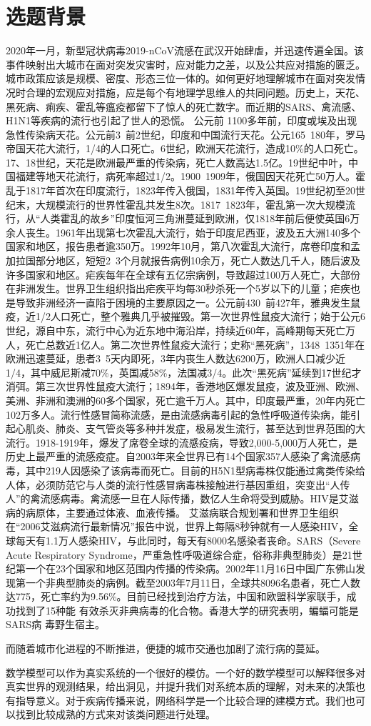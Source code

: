\chapter{选题背景}

2020年一月，新型冠状病毒2019-nCoV流感在武汉开始肆虐，并迅速传遍全国。该事件映射出大城市在面对突发灾害时，应对能力之差，以及公共应对措施的匮乏。城市政策应该是规模、密度、形态三位一体的\cite{xiu_2003}。如何更好地理解城市在面对突发情况时合理的宏观应对措施，应是每个有地理学思维人的共同问题。历史上，天花、黑死病、痢疾、霍乱等瘟疫都留下了惊人的死亡数字。而近期的SARS、禽流感、H1N1等疾病的流行也引起了世人的恐慌。 公元前 1100多年前，印度或埃及出现急性传染病天花。公元前3~前2世纪，印度和中国流行天花。公元165~180年，罗马帝国天花大流行，1/4的人口死亡。6世纪，欧洲天花流行，造成10\%的人口死亡。17、18世纪，天花是欧洲最严重的传染病，死亡人数高达1.5亿。19世纪中叶，中国福建等地天花流行，病死率超过1/2。1900~1909年，俄国因天花死亡50万人。霍乱于1817年首次在印度流行，1823年传入俄国，1831年传入英国。19世纪初至20世纪末，大规模流行的世界性霍乱共发生8次。1817~1823年，霍乱第一次大规模流行，从“人类霍乱的故乡”印度恒河三角洲蔓延到欧洲，仅1818年前后便使英国6万余人丧生。1961年出现第七次霍乱大流行，始于印度尼西亚，波及五大洲140多个国家和地区，报告患者逾350万。1992年10月，第八次霍乱大流行，席卷印度和孟加拉国部分地区，短短2~3个月就报告病例10余万，死亡人数达几千人，随后波及许多国家和地区。疟疾每年在全球有五亿宗病例，导致超过100万人死亡，大部份在非洲发生。世界卫生组织指出疟疾平均每30秒杀死一个5岁以下的儿童；疟疾也是导致非洲经济一直陷于困境的主要原因之一。公元前430~前427年，雅典发生鼠疫，近1/2人口死亡，整个雅典几乎被摧毁。第一次世界性鼠疫大流行；始于公元6世纪，源自中东，流行中心为近东地中海沿岸，持续近60年，高峰期每天死亡万人，死亡总数近1亿人。第二次世界性鼠疫大流行；史称“黑死病”，1348~1351年在欧洲迅速蔓延，患者3~5天内即死，3年内丧生人数达6200万，欧洲人口减少近1/4，其中威尼斯减70\%，英国减58\%，法国减3/4。此次“黑死病”延续到17世纪才消弭。第三次世界性鼠疫大流行；1894年，香港地区爆发鼠疫，波及亚洲、欧洲、美洲、非洲和澳洲的60多个国家，死亡逾千万人。其中，印度最严重，20年内死亡102万多人。流行性感冒简称流感，是由流感病毒引起的急性呼吸道传染病，能引起心肌炎、肺炎、支气管炎等多种并发症，极易发生流行，甚至达到世界范围的大流行。1918-1919年，爆发了席卷全球的流感疫病，导致2,000-5,000万人死亡，是历史上最严重的流感疫症。自2003年来全世界已有14个国家357人感染了禽流感病毒，其中219人因感染了该病毒而死亡。目前的H5N1型病毒株仅能通过禽类传染给人体，必须防范它与人类的流行性感冒病毒株接触进行基因重组，突变出“人传人”的禽流感病毒。禽流感一旦在人际传播，数亿人生命将受到威胁。HIV是艾滋病的病原体，主要通过体液、血液传播。 艾滋病联合规划署和世界卫生组织在“2006艾滋病流行最新情况”报告中说，世界上每隔8秒钟就有一人感染HIV，全球每天有1.1万人感染HIV，与此同时，每天有8000名感染者丧命。SARS（Severe Acute Respiratory Syndrome，严重急性呼吸道综合症，俗称非典型肺炎）是21世纪第一个在23个国家和地区范围内传播的传染病。2002年11月16日中国广东佛山发现第一个非典型肺炎的病例。截至2003年7月11日，全球共8096名患者，死亡人数达775，死亡率约为9.56\%。目前已经找到治疗方法，中国和欧盟科学家联手，成功找到了15种能 有效杀灭非典病毒的化合物。香港大学的研究表明，蝙蝠可能是SARS病 毒野生宿主。

而随着城市化进程的不断推进，便捷的城市交通也加剧了流行病的蔓延。

数学模型可以作为真实系统的一个很好的模仿。一个好的数学模型可以解释很多对真实世界的观测结果，给出洞见，并提升我们对系统本质的理解，对未来的决策也有指导意义。对于疾病传播来说，网络科学是一个比较合理的建模方式。我们也可以找到比较成熟的方式来对该类问题进行处理\cite{kiss2017mathematics}。
